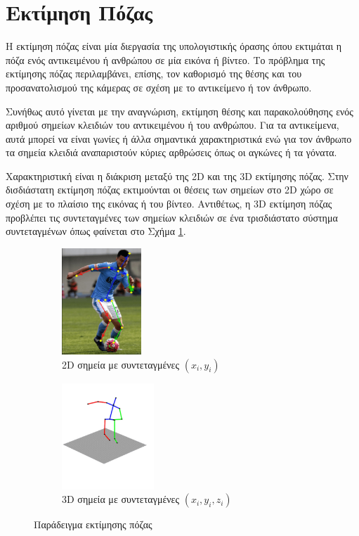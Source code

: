 \section{Εκτίμηση Πόζας}
\label{sec:poze}

Η εκτίμηση πόζας είναι μία διεργασία της υπολογιστικής όρασης όπου εκτιμάται η πόζα ενός αντικειμένου ή ανθρώπου σε μία εικόνα ή βίντεο. Το πρόβλημα της εκτίμησης πόζας περιλαμβάνει, επίσης, τον καθορισμό της θέσης και του προσανατολισμού της κάμερας σε σχέση με το αντικείμενο ή τον άνθρωπο.

Συνήθως αυτό γίνεται με την αναγνώριση, εκτίμηση θέσης και παρακολούθησης ενός αριθμού σημείων κλειδιών του αντικειμένου ή του ανθρώπου. Για τα αντικείμενα, αυτά μπορεί να είναι γωνίες ή άλλα σημαντικά χαρακτηριστικά ενώ για τον άνθρωπο τα σημεία κλειδιά αναπαριστούν κύριες αρθρώσεις όπως οι αγκώνες ή τα γόνατα.

Χαρακτηριστική είναι η διάκριση μεταξύ της 2D και της 3D εκτίμησης πόζας. Στην δισδιάστατη εκτίμηση πόζας εκτιμούνται οι θέσεις των σημείων στο 2D χώρο σε σχέση με το πλαίσιο της εικόνας ή του βίντεο. Αντιθέτως, η 3D εκτίμηση πόζας προβλέπει τις συντεταγμένες των σημείων κλειδιών σε ένα τρισδιάστατο σύστημα συντεταγμένων όπως φαίνεται στο Σχήμα \ref{fig:pose_estimation_example}.

\begin{figure}[h]
    \centering
    \begin{subfigure}{.5\textwidth}
      \centering
      \includegraphics[width=.4\linewidth, height=4cm]{images/chapter2/3d_pose_estimation/2d_estimation_example.jpg}
      \caption{2D σημεία με συντεταγμένες $(x_i, y_i)$}
    \end{subfigure}%
    \begin{subfigure}{.5\textwidth}
      \centering
      \includegraphics[width=.4\linewidth, height=4cm]{images/chapter2/3d_pose_estimation/3d_estimation_example.jpg}
      \caption{3D σημεία με συντεταγμένες $(x_i, y_i, z_i)$}
    \end{subfigure}
    \caption{Παράδειγμα εκτίμησης πόζας}
    \label{fig:pose_estimation_example}
\end{figure}

